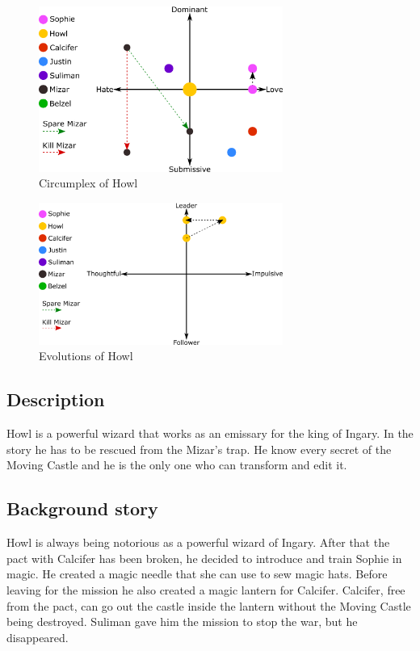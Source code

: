 \begin{figure}[H]
  \centering
  \includegraphics[width=8cm]{Images/SVG/Exported/Circumplexes/howlCircumplex}
  \caption{Circumplex of Howl}
\end{figure}

\begin{figure}[H]
  \centering
  \includegraphics[width=8cm]{Images/SVG/Exported/Evolutions/howlEvolution}
  \caption{Evolutions of Howl}
\end{figure}


\subsection{Description}
Howl is a powerful wizard that works as an emissary for the king of Ingary. In the story he has to be rescued from the Mizar’s trap. He know every secret of the Moving Castle and he is the only one who can transform and edit it.

\subsection{Background story}
Howl is always being notorious as a powerful wizard of Ingary. After that the pact with Calcifer has been broken, he decided to introduce and train Sophie in magic. He created a magic needle that she can use to sew magic hats. Before leaving for the mission he also created a magic lantern for Calcifer. Calcifer, free from the pact, can go out the castle inside the lantern without the Moving Castle being destroyed. Suliman gave him the mission to stop the war, but he disappeared.
